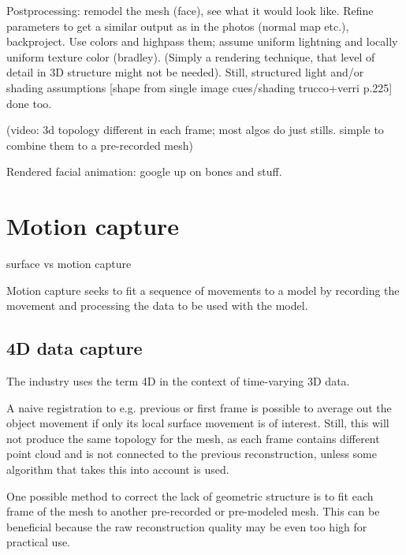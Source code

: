 Postprocessing: remodel the mesh (face), see what it would look like.
Refine parameters to get a similar output as in the photos (normal map etc.), backproject.
Use colors and highpass them; assume uniform lightning and locally uniform texture color (bradley).
(Simply a rendering technique, that level of detail in 3D structure might not be needed).
Still, structured light and/or shading assumptions [shape from single image cues/shading trucco+verri p.225] done too.

(video: 3d topology different in each frame; most algos do just stills. simple to combine them to a pre-recorded mesh)

Rendered facial animation: google up on bones and stuff.

\clearpage
\section{Motion capture}

surface vs motion capture

Motion capture seeks to fit a sequence of movements to a model by recording the movement and processing the data to be used with the model. \cite{find-a-definition-somewhere}



\subsection{4D data capture} %

The industry uses the term 4D in the context of time-varying 3D data.

A naive registration to e.g. previous or first frame is possible to average out the object movement if only its local surface movement is of interest.
Still, this will not produce the same topology for the mesh, as each frame contains different point cloud and is not connected to the previous reconstruction, unless some algorithm that takes this into account is used.

One possible method to correct the lack of geometric structure is to fit each frame of the mesh to another pre-recorded or pre-modeled mesh. \cite{somewhere,remedysoftware?}
This can be beneficial because the raw reconstruction quality may be even too high for practical use.

